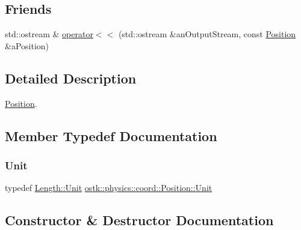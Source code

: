 \subsection*{Friends}
\begin{DoxyCompactItemize}
\item 
std\+::ostream \& \hyperlink{classostk_1_1physics_1_1coord_1_1_position_aab9f362c268370239ccad2c8a6d0eaee}{operator$<$$<$} (std\+::ostream \&an\+Output\+Stream, const \hyperlink{classostk_1_1physics_1_1coord_1_1_position}{Position} \&a\+Position)
\end{DoxyCompactItemize}


\subsection{Detailed Description}
\hyperlink{classostk_1_1physics_1_1coord_1_1_position}{Position}. 

\subsection{Member Typedef Documentation}
\mbox{\label{classostk_1_1physics_1_1coord_1_1_position_a2a02f1f2ef0d93230e25aa27f12545c0}} 
\subsubsection{\texorpdfstring{Unit}{Unit}}
{\footnotesize\ttfamily typedef \hyperlink{classostk_1_1physics_1_1units_1_1_length_a2664470a7eedf5d45c88861fe69badea}{Length\+::\+Unit} \hyperlink{classostk_1_1physics_1_1units_1_1_length_a2664470a7eedf5d45c88861fe69badea}{ostk\+::physics\+::coord\+::\+Position\+::\+Unit}}



\subsection{Constructor \& Destructor Documentation}
\mbox{\label{classostk_1_1physics_1_1coord_1_1_position_a395cdb1415e49ae38dfef883fcc397d7}} 
